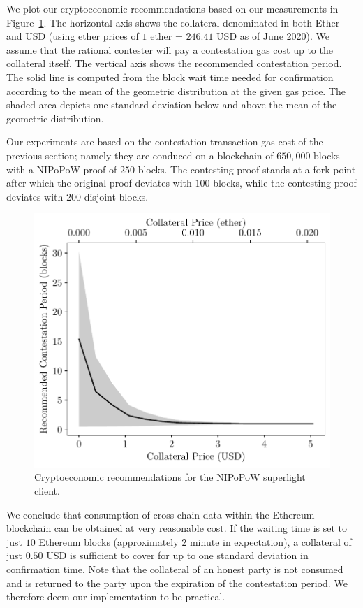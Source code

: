 We plot our cryptoeconomic recommendations based on our measurements in
Figure~\ref{fig:cryptoeconomics}. The horizontal axis shows the collateral
denominated in both Ether and USD (using ether prices of $1$ ether = $246.41$
USD as of June 2020).  We assume that the rational contester will pay a
contestation gas cost up to the collateral itself. The vertical axis shows the
recommended contestation period.  The solid line is computed from the block
wait time needed for confirmation according to the mean of the geometric
distribution at the given gas price.  The shaded area depicts one standard
deviation below and above the mean of the geometric distribution.

Our experiments are based on the contestation transaction gas cost of the
previous section; namely they are conduced on a blockchain of $650{,}000$
blocks with a NIPoPoW proof of $250$ blocks. The contesting proof stands at a
fork point after which the original proof deviates with $100$ blocks, while the
contesting proof deviates with $200$ disjoint blocks.

\begin{figure}[h]
    \begin{center}
        \includegraphics[width=0.6\columnwidth]{figures/collateral-contest.pdf}
    \end{center}
    \caption{Cryptoeconomic recommendations for the NIPoPoW superlight client.}
    \label{fig:cryptoeconomics}
\end{figure}

We conclude that consumption of cross-chain data within the Ethereum blockchain
can be obtained at very reasonable cost. If the waiting time is set to just
$10$ Ethereum blocks (approximately $2$ minute in expectation), a collateral of
just $0.50$ USD is sufficient to cover for up to one standard deviation in
confirmation time. Note that the collateral of an honest party is not consumed
and is returned to the party upon the expiration of the contestation period. We
therefore deem our implementation to be practical.

